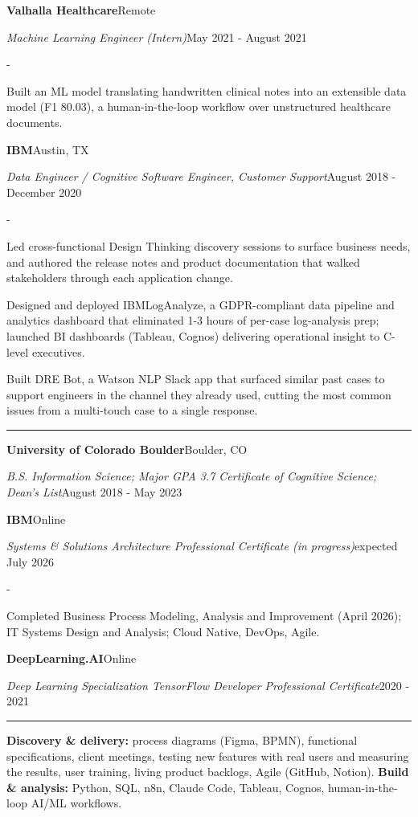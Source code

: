 \documentclass[10pt,letterpaper]{article}
\newenvironment{cvitems}{%
  \begin{list}{-}{%
    \setlength{\leftmargin}{12pt}%
    \setlength{\itemsep}{1.2pt}%
    \setlength{\parsep}{0pt}%
    \setlength{\topsep}{1.5pt}%
    \setlength{\partopsep}{0pt}%
    \setlength{\labelwidth}{6pt}%
    \setlength{\labelsep}{6pt}%
    \setlength{\itemindent}{0pt}%
  }%
}{\end{list}}
\newcommand{\cvsection}[1]{%
  \vspace{7pt}%
  \noindent{\bfseries\fontsize{11pt}{13pt}\selectfont\MakeUppercase{#1}}\par
  \vspace{1pt}%
  \noindent\rule{\textwidth}{0.4pt}\par
  \vspace{4pt}%
}
\newcommand{\cventryhead}[4]{%
  \noindent\textbf{#1}\hfill#2\par
  \vspace{0.5pt}%
  \noindent\textit{#3}\hfill#4\par
}
\newcommand{\cveduhead}[4]{%
  \noindent\textbf{#1}\hfill#2\par
  \vspace{0.5pt}%
  \noindent\textit{#3}\hfill#4\par
}
\begin{document}
\vspace{3pt}
\cventryhead{Valhalla Healthcare}{Remote}
{Machine Learning Engineer (Intern)}{May 2021 - August 2021}
\begin{cvitems}
  \item Built an ML model translating handwritten clinical notes into an extensible data model (F1 80.03), a human-in-the-loop workflow over unstructured healthcare documents.
\end{cvitems}

\vspace{3pt}
\cventryhead{IBM}{Austin, TX}
{Data Engineer / Cognitive Software Engineer, Customer Support}{August 2018 - December 2020}
\begin{cvitems}
  \item Led cross-functional Design Thinking discovery sessions to surface business needs, and authored the release notes and product documentation that walked stakeholders through each application change.
  \item Designed and deployed IBMLogAnalyze, a GDPR-compliant data pipeline and analytics dashboard that eliminated 1-3 hours of per-case log-analysis prep; launched BI dashboards (Tableau, Cognos) delivering operational insight to C-level executives.
  \item Built DRE Bot, a Watson NLP Slack app that surfaced similar past cases to support engineers in the channel they already used, cutting the most common issues from a multi-touch case to a single response.
\end{cvitems}

\cvsection{Education}

\cveduhead{University of Colorado Boulder}{Boulder, CO}
{B.S. Information Science; Major GPA 3.7 \textbar{} Certificate of Cognitive Science; Dean's List}{August 2018 - May 2023}

\vspace{3pt}
\cveduhead{IBM}{Online}
{Systems \& Solutions Architecture Professional Certificate (in progress)}{expected July 2026}
\begin{cvitems}
  \item Completed Business Process Modeling, Analysis and Improvement (April 2026); IT Systems Design and Analysis; Cloud Native, DevOps, Agile.
\end{cvitems}

\vspace{3pt}
\cveduhead{DeepLearning.AI}{Online}
{Deep Learning Specialization \textbar{} TensorFlow Developer Professional Certificate}{2020 - 2021}

\cvsection{Skills}

{\raggedright
\noindent\textbf{Discovery \& delivery:} process diagrams (Figma, BPMN), functional specifications, client meetings, testing new features with real users and measuring the results, user training, living product backlogs, Agile (GitHub, Notion). \textbf{Build \& analysis:} Python, SQL, n8n, Claude Code, Tableau, Cognos, human-in-the-loop AI/ML workflows.\par
}
\end{document}
